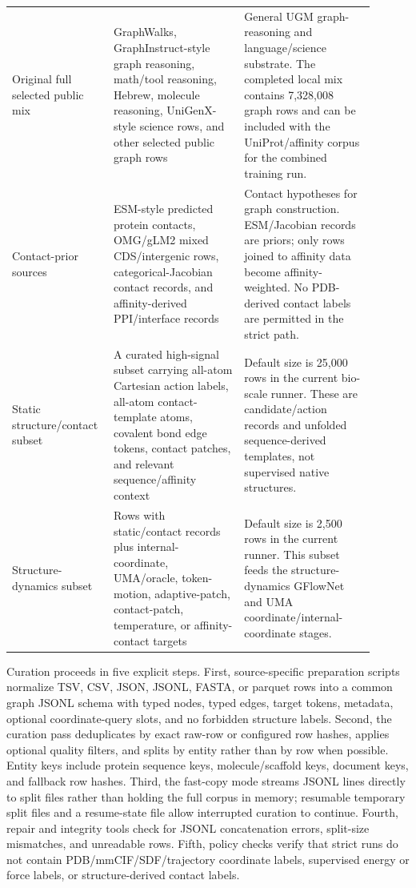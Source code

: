 \documentclass[11pt]{article}
\begin{document}
\begin{longtable}{p{0.22\linewidth}p{0.34\linewidth}p{0.34\linewidth}}
Original full selected public mix & GraphWalks, GraphInstruct-style graph reasoning, math/tool reasoning, Hebrew, molecule reasoning, UniGenX-style science rows, and other selected public graph rows & General UGM graph-reasoning and language/science substrate. The completed local mix contains 7,328,008 graph rows and can be included with the UniProt/affinity corpus for the combined training run.\\
Contact-prior sources & ESM-style predicted protein contacts, OMG/gLM2 mixed CDS/intergenic rows, categorical-Jacobian contact records, and affinity-derived PPI/interface records & Contact hypotheses for graph construction. ESM/Jacobian records are priors; only rows joined to affinity data become affinity-weighted. No PDB-derived contact labels are permitted in the strict path.\\
Static structure/contact subset & A curated high-signal subset carrying all-atom Cartesian action labels, all-atom contact-template atoms, covalent bond edge tokens, contact patches, and relevant sequence/affinity context & Default size is 25,000 rows in the current bio-scale runner. These are candidate/action records and unfolded sequence-derived templates, not supervised native structures.\\
Structure-dynamics subset & Rows with static/contact records plus internal-coordinate, UMA/oracle, token-motion, adaptive-patch, contact-patch, temperature, or affinity-contact targets & Default size is 2,500 rows in the current runner. This subset feeds the structure-dynamics GFlowNet and UMA coordinate/internal-coordinate stages.\\
\bottomrule
\end{longtable}

Curation proceeds in five explicit steps. First, source-specific preparation scripts normalize TSV, CSV, JSON, JSONL, FASTA, or parquet rows into a common graph JSONL schema with typed nodes, typed edges, target tokens, metadata, optional coordinate-query slots, and no forbidden structure labels. Second, the curation pass deduplicates by exact raw-row or configured row hashes, applies optional quality filters, and splits by entity rather than by row when possible. Entity keys include protein sequence keys, molecule/scaffold keys, document keys, and fallback row hashes. Third, the fast-copy mode streams JSONL lines directly to split files rather than holding the full corpus in memory; resumable temporary split files and a resume-state file allow interrupted curation to continue. Fourth, repair and integrity tools check for JSONL concatenation errors, split-size mismatches, and unreadable rows. Fifth, policy checks verify that strict runs do not contain PDB/mmCIF/SDF/trajectory coordinate labels, supervised energy or force labels, or structure-derived contact labels.
\end{document}

